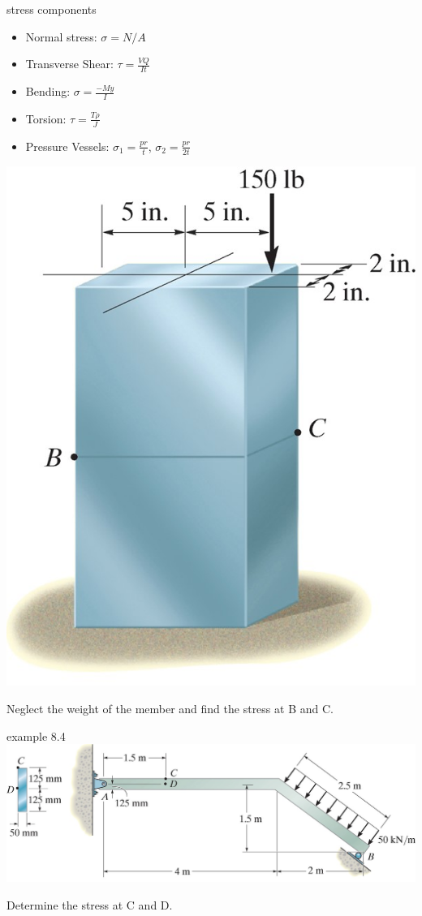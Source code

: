 \documentclass[
  letterpaper,
  ignorenonframetext,
  aspectratio=43,
  handout,
  12pt]{beamer}
\providecommand{\tightlist}{%
  \setlength{\itemsep}{0pt}\setlength{\parskip}{0pt}}
\providecommand{\tightlist}{%
\setlength{\itemsep}{0pt}\setlength{\parskip}{0pt}}
\let\Oldincludegraphics\includegraphics
\renewcommand{\includegraphics}[2][]{\Oldincludegraphics[width=\textwidth,height=0.7\textheight,keepaspectratio]{#2}}
\begin{document}
\begin{frame}{stress components}
\protect\hypertarget{stress-components}{}
\begin{itemize}
\tightlist
\item
  Normal stress: \(\sigma = N/A\)
\item
  Transverse Shear: \(\tau = \frac{VQ}{It}\)
\item
  Bending: \(\sigma = \frac{-My}{I}\)
\item
  Torsion: \(\tau = \frac{T\rho}{J}\)
\item
  Pressure Vessels: \(\sigma_1 = \frac{pr}{t}\),
  \(\sigma_2 = \frac{pr}{2t}\)
\end{itemize}

\includegraphics{../images/example-8-2.jpg}

Neglect the weight of the member and find the stress at B and C.
\end{frame}

\begin{frame}{example 8.4}
\protect\hypertarget{example-8.4}{}
\includegraphics{../images/example-8-4.jpg}

Determine the stress at C and D.
\end{frame}
\end{document}

